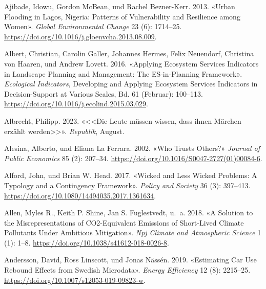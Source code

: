 \documentclass[
  nswissgerman,
  a4paper,
  openany]{book}
\newlength{\cslhangindent}
\newenvironment{CSLReferences}[2] %
 {\begin{list}{}{%
  \setlength{\itemindent}{0pt}
  \setlength{\leftmargin}{0pt}
  \setlength{\parsep}{0pt}
  \ifodd #1
   \setlength{\leftmargin}{\cslhangindent}
   \setlength{\itemindent}{-1\cslhangindent}
  \fi
  \setlength{\itemsep}{#2\baselineskip}}}
 {\end{list}}
\begin{document}
\protect{}\label{refs}
\begin{CSLReferences}{1}{1}
Ajibade, Idowu, Gordon McBean, und Rachel Bezner-Kerr. 2013. {«Urban
Flooding in {Lagos}, {Nigeria}: {Patterns} of Vulnerability and
Resilience among Women»}. \emph{Global Environmental Change} 23 (6):
1714--25. \url{https://doi.org/10.1016/j.gloenvcha.2013.08.009}.

{Albert, Christian, Carolin Galler, Johannes Hermes, Felix Neuendorf,
Christina von Haaren, und Andrew Lovett}. 2016. {«Applying Ecosystem
Services Indicators in Landscape Planning and Management: {The
ES-in-Planning} Framework»}. \emph{Ecological Indicators}, Developing
and {Applying Ecosystem Services Indicators} in {Decision-Support} at
{Various Scales}, Bd. 61 (Februar): 100--113.
\url{https://doi.org/10.1016/j.ecolind.2015.03.029}.

Albrecht, Philipp. 2023. {«{\textless\textless Die Leute m{ü}ssen
wissen, dass ihnen M{ä}rchen erz{ä}hlt
werden\textgreater\textgreater{}}»}. \emph{Republik}, August.

Alesina, Alberto, und Eliana La Ferrara. 2002. {«Who Trusts Others?»}
\emph{Journal of Public Economics} 85 (2): 207--34.
\url{https://doi.org/10.1016/S0047-2727(01)00084-6}.

Alford, John, und Brian W. Head. 2017. {«Wicked and Less Wicked
Problems: A Typology and a Contingency Framework»}. \emph{Policy and
Society} 36 (3): 397--413.
\url{https://doi.org/10.1080/14494035.2017.1361634}.

Allen, Myles R., Keith P. Shine, Jan S. Fuglestvedt, u.~a. 2018. {«A
Solution to the Misrepresentations of {CO2-Equivalent} Emissions of
Short-Lived Climate Pollutants Under Ambitious Mitigation»}. \emph{Npj
Climate and Atmospheric Science} 1 (1): 1--8.
\url{https://doi.org/10.1038/s41612-018-0026-8}.

Andersson, David, Ross Linscott, und Jonas Nässén. 2019. {«Estimating
Car Use Rebound Effects from {Swedish} Microdata»}. \emph{Energy
Efficiency} 12 (8): 2215--25.
\url{https://doi.org/10.1007/s12053-019-09823-w}.


\end{CSLReferences}
\end{document}

